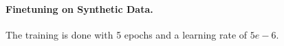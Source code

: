 \paragraph{Finetuning on Synthetic Data.} The training is done with 5 epochs and a learning rate of $5e-6$. 






